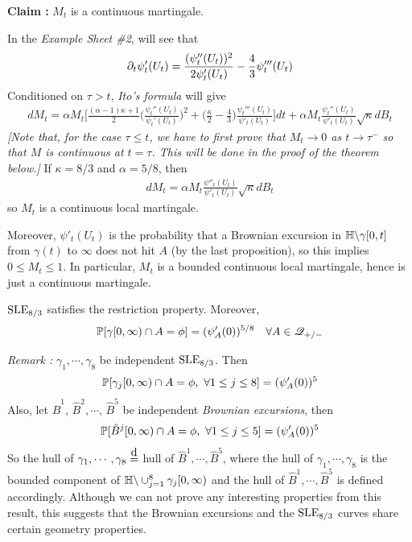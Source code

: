 \documentclass[12pt,a4paper]{article}
\newcommand\xeq{\stackrel{\mathclap{\normalfont\mbox{d}}}{=}}
\newenvironment{proof}
{\begin{changemargin}{0.5cm}{0.5cm} 
	}%
	{\end{changemargin}
}
\newenvironment{p}
{\begin{proof} 
	}%
	{\end{proof}
}
\begin{document}
\textbf{Claim :} $M_t$ is a continuous martingale.
\begin{p}
\pf In the \emph{Example Sheet \#2}, will see that 
\begin{align*}
\partial_t \psi'_t(U_t) = \frac{(\psi_t''(U_t))^2}{2\psi'_t (U_t)} - \frac{4}{3} \psi_t'''(U_t)
\end{align*}
Conditioned on $\tau >t$, \emph{Ito's formula} will give
\begin{align*}
dM_t =\alpha M_t \Big[ \frac{(\alpha-1)\kappa +1}{2}\Big( \frac{\psi_t''(U_t)}{\psi_t'(U_t)} \Big)^2 + \Big( \frac{\kappa}{2} - \frac{4}{3}\Big) \frac{\psi_t'''(U_t)}{\psi'_t(U_t)}\Big] dt + \alpha M_t \frac{\psi_t''(U_t)}{\psi'_t(U_t)} \sqrt{\kappa} dB_t
\end{align*}
\emph{[Note that, for the case $\tau \leq t$, we have to first prove that $M_t \rightarrow 0$ as $t\rightarrow \tau^-$ so that $M$ is continuous at $t=\tau$. This will be done in the proof of the theorem below.]}
If $\kappa =8/3$ and $\alpha =5/8$, then
\begin{align*}
dM_t = \alpha M_t \frac{\psi''_t(U_t)}{\psi'_t(U_t)} \sqrt{\kappa} dB_t
\end{align*}
so $M_t$ is a continuous local martingale. 

\quad Moreover, $\psi'_t(U_t)$ is the probability that a Brownian excursion in $\mathbb{H} \backslash \gamma[0,t]$ from $\gamma(t)$ to $\infty$ does not hit $A$ (by the last proposition), so this implies $0\leq M_t \leq 1$. In particular, $M_t$ is a bounded continuous local martingale, hence is just a continuous martingale.

\eop 
\end{p}

\thm $\text{SLE}_{8/3}$ satisfies the restriction property. Moreover,
\begin{align*}
\mathbb{P} [\gamma[0, \infty) \cap A =\phi]=(\psi'_A(0))^{5/8} \quad \forall A\in \mathscr{Q}_{+/-}
\end{align*}
\s

\emph{Remark :} $\gamma_1, \cdots, \gamma_8$ be independent $\text{SLE}_{8/3}$. Then
\begin{align*}
\mathbb{P} [\gamma_j[0, \infty) \cap A = \phi,\,\, \forall 1\leq j\leq 8] = (\psi_A'(0))^5
\end{align*}
Also, let $\hat{B}^1$, $\hat{B}^2, \cdots$, $\hat{B}^5$ be independent \emph{Brownian excursions}, then
\begin{align*}
\mathbb{P} [\hat{B}^j [0, \infty) \cap A = \phi,\,\, \forall 1\leq j\leq 5] = (\psi_A'(0))^5
\end{align*}
So the hull of $\gamma_1, \cdots, \gamma_8 \xeq$ hull of $\hat{B}^1, \cdots,  \hat{B}^5$, where the hull of $\gamma_1, \cdots, \gamma_8$ is the bounded component of $\mathbb{H} \backslash \cup_{j=1}^8 \gamma_j[0, \infty)$ and the hull of $\hat{B}^1, \cdots,  \hat{B}^5$ is defined accordingly. Although we can not prove any interesting properties from this result, this suggests that the Brownian excursions and the $\text{SLE}_{8/3}$ curves share certain geometry properties.
\s
\end{document}
